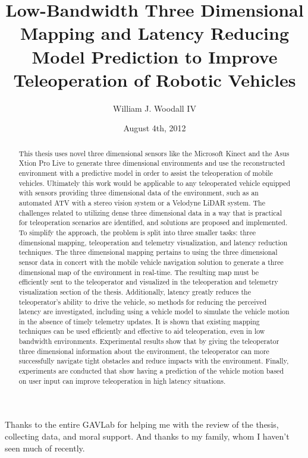 \documentclass[12pt]{report}
\title{Low-Bandwidth Three Dimensional Mapping and Latency Reducing Model Prediction to Improve Teleoperation of Robotic Vehicles}
\author{William J. Woodall IV}
\date{August 4th, 2012} %
\begin{document}

\begin{romanpages}      %

\TitlePage 


\begin{abstract} 
This thesis uses novel three dimensional sensors like the Microsoft Kinect\cite{KINECT} and the Asus Xtion Pro Live\cite{ASUS} to generate three dimensional environments and use the reconstructed environment with a predictive model in order to assist the teleoperation of mobile vehicles.  Ultimately this work would be applicable to any teleoperated vehicle equipped with sensors providing three dimensional data of the environment, such as an automated ATV with a stereo vision system or a Velodyne LiDAR\cite{halterman2010velodyne} system.  The challenges related to utilizing dense three dimensional data in a way that is practical for teleoperation scenarios are identified, and solutions are proposed and implemented.  To simplify the approach, the problem is split into three smaller tasks: three dimensional mapping, teleoperation and telemetry visualization, and latency reduction techniques.  The three dimensional mapping pertains to using the three dimensional sensor data in concert with the mobile vehicle navigation solution to generate a three dimensional map of the environment in real-time.  The resulting map must be efficiently sent to the teleoperator and visualized in the teleoperation and telemetry visualization section of the thesis.  Additionally, latency greatly reduces the teleoperator's ability to drive the vehicle, so methods for reducing the perceived latency are investigated, including using a vehicle model to simulate the vehicle motion in the absence of timely telemetry updates.  It is shown that existing mapping techniques can be used efficiently and effective to aid teleoperation, even in low bandwidth environments.  Experimental results show that by giving the teleoperator three dimensional information about the environment, the teleoperator can more successfully navigate tight obstacles and reduce impacts with the environment.  Finally, experiments are conducted that show having a prediction of the vehicle motion based on user input can improve teleoperation in high latency situations.
\end{abstract}


\begin{acknowledgments}
Thanks to the entire GAVLab for helping me with the review of the thesis, collecting data, and moral support.  And thanks to my family, whom I haven't seen much of recently.
\end{acknowledgments}

\tableofcontents
\listoffigures
\listoftables
\listofalgorithms

\printnomenclature[0.5in] %
\end{romanpages}        %
\end{document}
